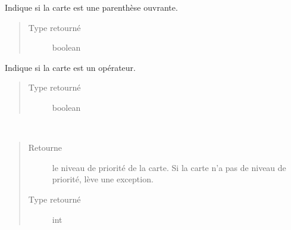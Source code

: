 \documentclass[letterpaper,10pt,french]{sphinxmanual}
\begin{document}
\begin{fulllineitems}
\begin{fulllineitems}
\begin{quote}
\begin{description}
\end{description}\end{quote}

\end{fulllineitems}


\begin{fulllineitems}
\label{\detokenize{doc_classe:cards.Card.is_open}}
Indique si la carte est une parenthèse ouvrante.
\begin{quote}\begin{description}
\item[{Type retourné}] \leavevmode
boolean

\end{description}\end{quote}

\end{fulllineitems}


\begin{fulllineitems}
\label{\detokenize{doc_classe:cards.Card.is_operator}}
Indique si la carte est un opérateur.
\begin{quote}\begin{description}
\item[{Type retourné}] \leavevmode
boolean

\end{description}\end{quote}

\end{fulllineitems}


\begin{fulllineitems}
\label{\detokenize{doc_classe:cards.Card.priority}}~\begin{quote}\begin{description}
\item[{Retourne}] \leavevmode
le niveau de priorité de la carte. Si la carte n’a pas de
niveau de priorité, lève une exception.

\item[{Type retourné}] \leavevmode
int

\end{description}\end{quote}


\end{fulllineitems}
\end{fulllineitems}
\end{document}
